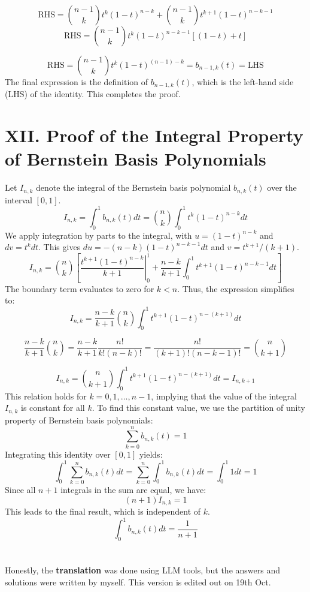 \documentclass[a4paper]{article}
\begin{document}
\[
\text{RHS} = \binom{n-1}{k}t^k(1-t)^{n-k} + \binom{n-1}{k}t^{k+1}(1-t)^{n-k-1}
\]
\[
\text{RHS} = \binom{n-1}{k}t^k(1-t)^{n-k-1} \left[ (1-t) + t \right]
\]

\[
\text{RHS} = \binom{n-1}{k}t^k(1-t)^{(n-1)-k} = b_{n-1,k}(t) =\text{LHS}
\]
The final expression is the definition of $b_{n-1,k}(t)$, which is the left-hand side (LHS) of the identity. This completes the proof.

\section*{XII. Proof of the Integral Property of Bernstein Basis Polynomials}

Let $I_{n,k}$ denote the integral of the Bernstein basis polynomial $b_{n,k}(t)$ over the interval $[0,1]$.
\[
I_{n,k} = \int_0^1 b_{n,k}(t) dt = \binom{n}{k} \int_0^1 t^k (1-t)^{n-k} dt
\]
We apply integration by parts to the integral, with $u=(1-t)^{n-k}$ and $dv=t^k dt$. This gives $du=-(n-k)(1-t)^{n-k-1}dt$ and $v=t^{k+1}/(k+1)$.
\[
I_{n,k} = \binom{n}{k} \left[ \left. \frac{t^{k+1}(1-t)^{n-k}}{k+1} \right|_0^1 + \frac{n-k}{k+1} \int_0^1 t^{k+1} (1-t)^{n-k-1} dt \right]
\]
The boundary term evaluates to zero for $k < n$. Thus, the expression simplifies to:
\[
I_{n,k} = \frac{n-k}{k+1} \binom{n}{k} \int_0^1 t^{k+1} (1-t)^{n-(k+1)} dt
\]

\[
\frac{n-k}{k+1} \binom{n}{k} = \frac{n-k}{k+1} \frac{n!}{k!(n-k)!} = \frac{n!}{(k+1)!(n-k-1)!} = \binom{n}{k+1}
\]

\[
I_{n,k} = \binom{n}{k+1} \int_0^1 t^{k+1} (1-t)^{n-(k+1)} dt = I_{n,k+1}
\]
This relation holds for $k = 0, 1, \dots, n-1$, implying that the value of the integral $I_{n,k}$ is constant for all $k$.
To find this constant value, we use the partition of unity property of Bernstein basis polynomials:
\[
\sum_{k=0}^n b_{n,k}(t) = 1
\]
Integrating this identity over $[0,1]$ yields:
\[
\int_0^1 \sum_{k=0}^n b_{n,k}(t) dt = \sum_{k=0}^n \int_0^1 b_{n,k}(t) dt = \int_0^1 1 dt = 1
\]
Since all $n+1$ integrals in the sum are equal, we have:
\[
(n+1) I_{n,k} = 1
\]
This leads to the final result, which is independent of $k$.
\[
\int_0^1 b_{n,k}(t) dt = \frac{1}{n+1}
\]










































\section*{  }
Honestly, the \textbf{translation} was done using LLM tools, but the answers and solutions were written by myself.
This version is edited out on 19th Oct.


\end{document}
